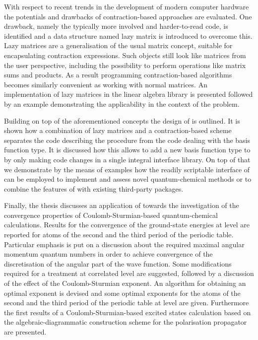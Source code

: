 With respect to recent trends in the development of modern computer hardware
the potentials and drawbacks of contraction-based approaches are evaluated.
One drawback, namely the typically more involved and harder-to-read code,
is identified and a data structure named lazy matrix is introduced
to overcome this.
Lazy matrices are a generalisation of the usual matrix concept,
suitable for encapsulating contraction expressions.
Such objects still look like matrices from the user perspective,
including the possibility to perform operations like matrix sums and products.
As a result programming contraction-based algorithms
becomes similarly convenient as working with normal matrices.
An implementation of lazy matrices in the \lazyten linear algebra library
is presented followed by an example
demonstrating the applicability in the context of the \HF problem.

Building on top of the aforementioned concepts the design of \molsturm is outlined.
It is shown how a combination of lazy matrices and a contraction-based \SCF scheme
separates the code describing the \SCF procedure
from the code dealing with the basis function type.
It is discussed how this allows to add a new basis function type
to \molsturm by only making code changes in a single integral interface library.
On top of that we demonstrate by the means of examples
how the readily scriptable interface of \molsturm
can be employed to implement and assess novel quantum-chemical methods
or to combine the features of \molsturm with existing third-party packages.

Finally, the thesis discusses an application of \molsturm
towards the investigation of the convergence properties
of Coulomb-Sturmian-based quantum-chemical calculations.
Results for the convergence
of the ground-state energies at \HF level
are reported for atoms of the second and the third period
of the periodic table.
Particular emphasis is put on a discussion about the required
maximal angular momentum quantum numbers
in order to achieve convergence
of the discretisation of the angular part of the wave function.
Some modifications required for a treatment at correlated level are suggested,
followed by a discussion of the effect of the Coulomb-Sturmian exponent.
An algorithm for obtaining an optimal exponent is devised
and some optimal exponents for the atoms of the
second and the third period of the periodic table at \HF level are given.
Furthermore the first results of a Coulomb-Sturmian-based excited
states calculation based on the algebraic-diagrammatic construction
scheme for the polarisation propagator are presented.


